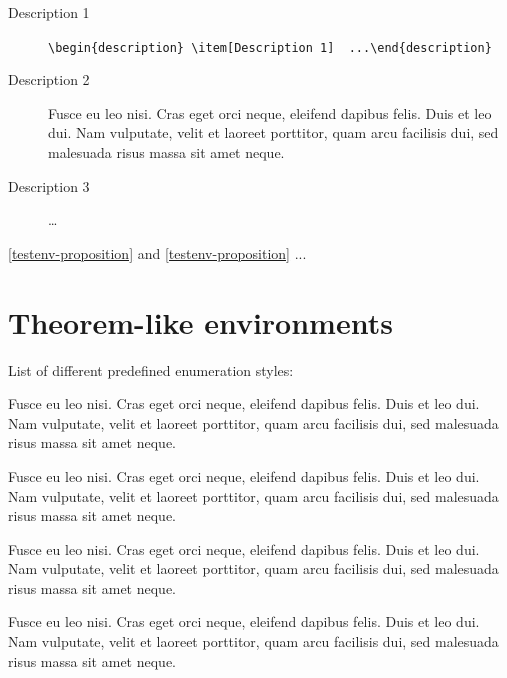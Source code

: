 \documentclass[a4paper,UKenglish,cleveref, autoref, thm-restate]{lipics-v2021}
\begin{document}
\begin{description}
\item[Description 1] \verb|\begin{description} \item[Description 1]  ...\end{description}|
\item[Description 2] Fusce eu leo nisi. Cras eget orci neque, eleifend dapibus felis. Duis et leo dui. Nam vulputate, velit et laoreet porttitor, quam arcu facilisis dui, sed malesuada risus massa sit amet neque.
\item[Description 3]  \dots
\end{description}

\cref{testenv-proposition} and \autoref{testenv-proposition} ...

\section{Theorem-like environments}\label{sec:theorem-environments}

List of different predefined enumeration styles:

\begin{theorem}\label{testenv-theorem}
Fusce eu leo nisi. Cras eget orci neque, eleifend dapibus felis. Duis et leo dui. Nam vulputate, velit et laoreet porttitor, quam arcu facilisis dui, sed malesuada risus massa sit amet neque.
\end{theorem}

\begin{lemma}\label{testenv-lemma}
Fusce eu leo nisi. Cras eget orci neque, eleifend dapibus felis. Duis et leo dui. Nam vulputate, velit et laoreet porttitor, quam arcu facilisis dui, sed malesuada risus massa sit amet neque.
\end{lemma}

\begin{corollary}\label{testenv-corollary}
Fusce eu leo nisi. Cras eget orci neque, eleifend dapibus felis. Duis et leo dui. Nam vulputate, velit et laoreet porttitor, quam arcu facilisis dui, sed malesuada risus massa sit amet neque.
\end{corollary}

\begin{proposition}\label{testenv-proposition}
Fusce eu leo nisi. Cras eget orci neque, eleifend dapibus felis. Duis et leo dui. Nam vulputate, velit et laoreet porttitor, quam arcu facilisis dui, sed malesuada risus massa sit amet neque.
\end{proposition}
\end{document}
